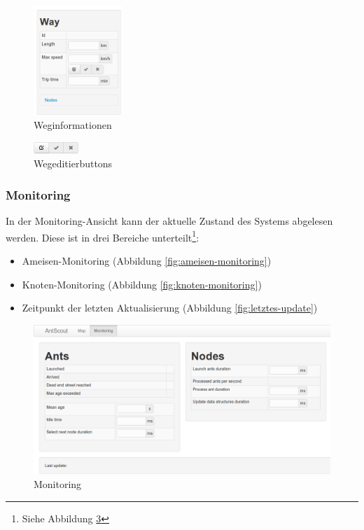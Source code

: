 \begin{figure}[htbp]
  \centering
  \includegraphics[width=0.3\textwidth]{Bilder/Weginformationen.png}
  \caption{Weginformationen}
  \label{fig:weginformationen}
\end{figure}

\begin{figure}[htbp]
  \centering
  \includegraphics[width=0.15\textwidth]{Bilder/Wegeditierbuttons.png}
  \caption{Wegeditierbuttons}
  \label{fig:wegeditierbuttons}
\end{figure}

\subsubsection{Monitoring}
\label{sec:monitoring}

In der Monitoring-Ansicht kann der aktuelle Zustand des Systems abgelesen werden.
Diese ist in drei Bereiche unterteilt\footnote{Siehe Abbildung \ref{fig:monitoring}}:

\begin{itemize}
  \item Ameisen-Monitoring (Abbildung \ref{fig:ameisen-monitoring})
  \item Knoten-Monitoring (Abbildung \ref{fig:knoten-monitoring})
  \item Zeitpunkt der letzten Aktualisierung (Abbildung \ref{fig:letztes-update})
\end{itemize}

\begin{figure}[htbp]
  \centering
  \includegraphics[width=\textwidth]{Bilder/Monitoring.png}
  \caption{Monitoring}
  \label{fig:monitoring}
\end{figure}

